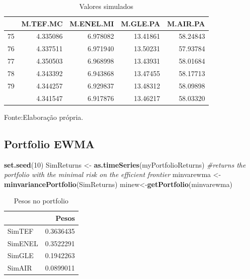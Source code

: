 \documentclass[
  12pt,
  a4paper,
  openany]{book}
\newenvironment{Shaded}{\begin{snugshade}}{\end{snugshade}}
\newcommand{\CommentTok}[1]{\textcolor[rgb]{0.56,0.35,0.01}{\textit{#1}}}
\newcommand{\DecValTok}[1]{\textcolor[rgb]{0.00,0.00,0.81}{#1}}
\newcommand{\KeywordTok}[1]{\textcolor[rgb]{0.13,0.29,0.53}{\textbf{#1}}}
\newcommand{\NormalTok}[1]{#1}
\newcommand{\StringTok}[1]{\textcolor[rgb]{0.31,0.60,0.02}{#1}}
\begin{document}
\normalsize
\begin{table}[!h]

\caption{\label{tab:unnamed-chunk-16}Valores simulados}
\centering
\begin{tabular}[t]{lrrrr}
\toprule
  & M.TEF.MC & M.ENEL.MI & M.GLE.PA & M.AIR.PA\\
\midrule
75 & 4.335086 & 6.978082 & 13.41861 & 58.24843\\
76 & 4.337511 & 6.971940 & 13.50231 & 57.93784\\
77 & 4.350503 & 6.968998 & 13.43931 & 58.01684\\
78 & 4.343392 & 6.943868 & 13.47455 & 58.17713\\
79 & 4.344257 & 6.929837 & 13.48312 & 58.09898\\
\addlinespace
80 & 4.341547 & 6.917876 & 13.46217 & 58.03320\\
\bottomrule
\end{tabular}
\end{table}
\FloatBarrier
\centering

Fonte:Elaboração própria.

\justifying
\bigskip

\hypertarget{portfolio-ewma}{%
\subsection{Portfolio EWMA}\label{portfolio-ewma}}

\scriptsize

\begin{Shaded}
\begin{Highlighting}[]
\KeywordTok{set.seed}\NormalTok{(}\DecValTok{10}\NormalTok{)}
\NormalTok{SimReturns \textless{}{-}}\StringTok{ }\KeywordTok{as.timeSeries}\NormalTok{(myPortfolioReturns)}
\CommentTok{\#returns the portfolio with the minimal risk on the efficient frontier}
\NormalTok{minvarewma \textless{}{-}}\StringTok{ }\KeywordTok{minvariancePortfolio}\NormalTok{(SimReturns) }
\NormalTok{minew\textless{}{-}}\KeywordTok{getPortfolio}\NormalTok{(minvarewma)}
\end{Highlighting}
\end{Shaded}

\normalsize

\begin{table}[!h]

\caption{\label{tab:unnamed-chunk-19}Pesos no portfolio}
\centering
\begin{tabular}[t]{lr}
\toprule
  & Pesos\\
\midrule
SimTEF & 0.3636435\\
SimENEL & 0.3522291\\
SimGLE & 0.1942263\\
SimAIR & 0.0899011\\
\bottomrule
\end{tabular}
\end{table}
\end{document}

